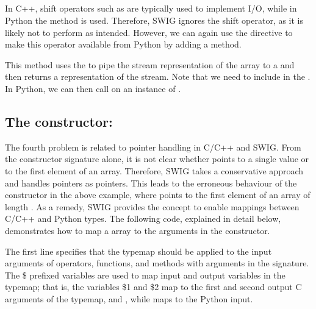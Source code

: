 \subsection{ }%
In C++, shift operators such as  are typically used to implement I/O, while in
Python the  method is used.    
Therefore, SWIG ignores the shift operator, as it is likely not to perform as intended. 
However, we can again use the  directive to make this
operator available from Python by adding a   method.
This method uses the  %
to pipe the stream representation of the array to a
 and then returns a 
representation of the stream.
Note that we need to include  in the .
In Python, we can then call  on an instance of .

\subsection{The constructor: }
The fourth problem is related to pointer handling in C/C++ and SWIG. From
the constructor signature alone, it is not clear whether  points to a single value or to the first element of an array.
Therefore, SWIG takes a conservative approach and handles pointers as
pointers. This leads to the erroneous behaviour of the constructor in the
above example, where   points to the first element of an array of length . 
As a remedy, SWIG provides the  concept to enable mappings
between C/C++ and Python types. The following code, explained in detail
below, demonstrates how to map a \numpy array to the  
arguments in the constructor.
The first line specifies that the typemap should be applied to the input
 arguments of operators, functions, and methods with 
 arguments in the signature. 
The \$ prefixed variables are used to map input and output variables in the typemap; 
that is, the variables \$1 and \$2 map to the first and second output C
arguments of the typemap,  and , while 
maps to the Python input. 

